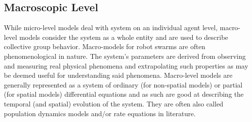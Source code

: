 \documentclass[Main.tex]{subfiles}
\begin{document}
\subsection{Macroscopic Level}
While micro-level models deal with system on an individual agent level, macro-level models consider the system as a whole entity and are used to describe collective group behavior. Macro-models for robot swarms are often phenomenological in nature. The system's parameters are derived from observing and measuring real physical phenomena and extrapolating such properties as may be deemed useful for understanding said phenomena. Macro-level models are generally represented as a system of ordinary (for non-spatial models) or partial (for spatial models) differential equations and as such are good at describing the temporal (and spatial) evolution of the system. They are often also called population dynamics models and/or rate equations in literature.
\end{document}
